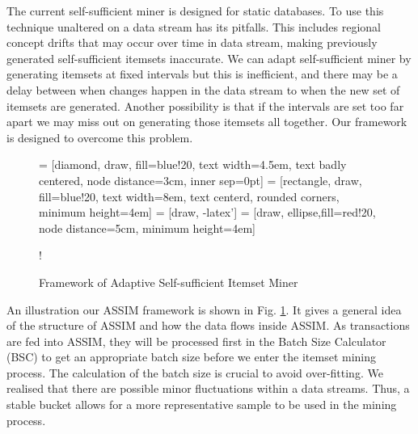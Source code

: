The current self-sufficient miner \cite{ssi} is designed for static databases. To use this technique unaltered on a data stream has its pitfalls. This includes regional concept drifts that may occur over time in data stream, making previously generated self-sufficient itemsets inaccurate. We can adapt self-sufficient miner by generating itemsets at fixed intervals but this is inefficient, and there may be a delay between when changes happen in the data stream to when the new set of itemsets are generated. Another possibility is that if the intervals are set too far apart we may miss out on generating those itemsets all together. Our framework is designed to overcome this problem.


\begin{figure}[h!]
    \centering
{} = [diamond, draw, fill=blue!20, 
    text width=4.5em, text badly centered, node distance=3cm, inner sep=0pt]
 = [rectangle, draw, fill=blue!20, 
    text width=8em, text centerd, rounded corners, minimum height=4em]
 = [draw, -latex']
 = [draw, ellipse,fill=red!20, node distance=5cm,
    minimum height=4em]

\resizebox {\columnwidth} {!} {
}
    \caption{Framework of Adaptive Self-sufficient Itemset Miner }
    \label{fig:ASSIM}
\end{figure} 


An illustration our ASSIM framework is shown in Fig. \ref{fig:ASSIM}. It gives a general idea of the structure of ASSIM and how the data flows inside ASSIM.
As transactions are fed into ASSIM, they will be processed first in the Batch Size Calculator (BSC) to get an appropriate batch size before we enter the itemset mining process. The calculation of the batch size is crucial to avoid over-fitting. We realised that there are possible minor fluctuations within a data streams. Thus, a stable bucket allows for a more representative sample to be used in the mining process.   

